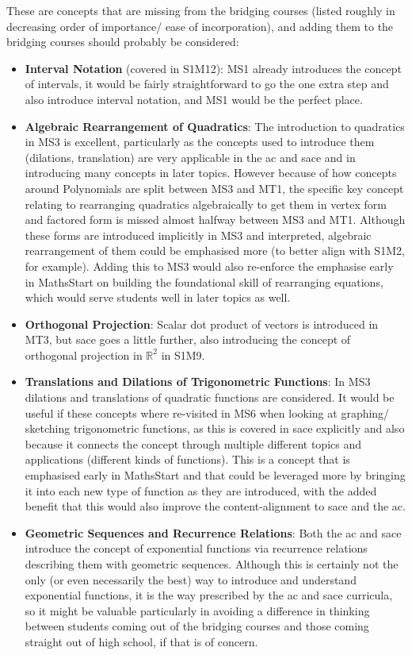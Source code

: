 \documentclass[twoside,12pt,a4paper]{report}
\begin{document}
These are concepts that are missing from the bridging courses (listed roughly in decreasing order of importance/ ease of incorporation), and adding them to the bridging courses should probably be considered:
\begin{itemize}
	\item \textbf{Interval Notation} (covered in S1M12): MS1 already introduces the concept of intervals, it would be fairly straightforward to go the one extra step and also introduce interval notation, and MS1 would be the perfect place.
	\item \textbf{Algebraic Rearrangement of Quadratics}:  The introduction to quadratics in MS3 is excellent, particularly as the concepts used to introduce them (dilations, translation) are very applicable in the \gls{ac} and \gls{sace} and in introducing many concepts in later topics. However because of how concepts around Polynomials are split between MS3 and MT1, the specific key concept relating to rearranging quadratics algebraically to get them in vertex form and factored form is missed almost halfway between MS3 and MT1. Although these forms are introduced implicitly in MS3 and interpreted, algebraic rearrangement of them could be emphasised more (to better align with S1M2, for example). Adding this to MS3 would also re-enforce the emphasise early in MathsStart on building the foundational skill of rearranging equations, which would serve students well in later topics as well. 
	\item \textbf{Orthogonal Projection}: Scalar dot product of vectors is introduced in MT3, but \gls{sace} goes a little further, also introducing the concept of orthogonal projection in $\mathbb{R}^2$ in S1M9.
	\item \textbf{Translations and Dilations of Trigonometric Functions}: In MS3 dilations and translations of quadratic functions are considered. It would be useful if these concepts where re-visited in MS6 when looking at graphing/ sketching trigonometric functions, as this is covered in \gls{sace} explicitly and also because it connects the concept through multiple different topics and applications (different kinds of functions). This is a concept that is emphasised early in MathsStart and that could be leveraged more by bringing it into each new type of function as they are introduced, with the added benefit that this would also improve the content-alignment to \gls{sace} and the \gls{ac}.
	\item \textbf{Geometric Sequences and Recurrence Relations}: Both the \gls{ac} and \gls{sace} introduce the concept of exponential functions via recurrence relations describing them with geometric sequences. Although this is certainly not the only (or even necessarily the best) way to introduce and understand exponential functions, it is the way prescribed by the \gls{ac} and \gls{sace} curricula, so it might be valuable particularly in avoiding a difference in thinking between students coming out of the bridging courses and those coming straight out of high school, if that is of concern. 
\end{itemize}
\end{document}
